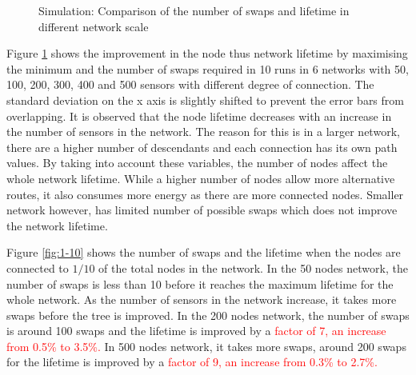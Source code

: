 \begin{figure}
\centering              
{}
\caption{Simulation: Comparison of the number of swaps and lifetime in different network scale}
\label{fig:maxmin}
\end{figure}

Figure \ref{fig:maxmin} shows the improvement in the node thus network lifetime by maximising the minimum and the number of swaps required in 10 runs in 6 networks with 50, 100, 200, 300, 400 and 500 sensors with different degree of connection. 
The standard deviation on the x axis is slightly shifted to prevent the error bars from overlapping.
It is observed that the node lifetime decreases with an increase in the number of sensors in the network. The reason for this is in a larger network, there are a higher number of descendants and each connection has its own path values. By taking into account these variables, the number of nodes affect the whole network lifetime. While a higher number of nodes allow more alternative routes, it also consumes more energy as there are more connected nodes. Smaller network however, has limited number of possible swaps which does not improve the network lifetime.

Figure \ref{fig:1-10} shows the number of swaps and the lifetime when the nodes are connected to $1/10$ of the total nodes in the network. 
In the 50 nodes network, the number of swaps is less than 10 before it reaches the maximum lifetime for the whole network. 
As the number of sensors in the network increase, it takes more swaps before the tree is improved. 
In the 200 nodes network, the number of swaps is around 100 swaps and the lifetime is improved by a \textcolor{red}{factor of 7, an increase from 0.5\% to 3.5\%.} In 500 nodes network, it takes more swaps, around 200 swaps for the lifetime is improved by a \textcolor{red}{factor of 9, an increase from 0.3\% to 2.7\%.} 

